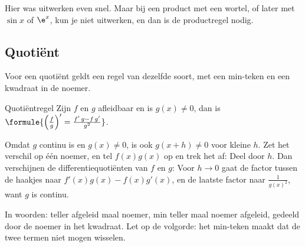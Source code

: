 Hier was uitwerken even snel. Maar bij een product met een wortel, of later met $\sin x$ of $\e^x$, kun je niet uitwerken, en dan is de productregel nodig.

\begin{oefeningen}
\end{oefeningen}

\subsection{Quotiënt}

Voor een quotiënt geldt een regel van dezelfde soort, met een min-teken en een kwadraat in de noemer.

\begin{theorie}
\begin{stelling}{Quotiëntregel}
Zijn $f$ en $g$ afleidbaar en is $g(x) \neq 0$, dan is \quad $\formule{\Bigl(\frac{f}{g}\Bigr)' = \frac{f'\,g - f\,g'}{g^2}}$.
\end{stelling}
\begin{bewijs}
Omdat $g$ continu is en $g(x) \neq 0$, is ook $g(x + h) \neq 0$ voor kleine $h$. Zet het verschil op één noemer, en tel $f(x)g(x)$ op en trek het af:
Deel door $h$. Dan verschijnen de differentiequotiënten van $f$ en $g$:
Voor $h \to 0$ gaat de factor tussen de haakjes naar $f'(x)g(x) - f(x)g'(x)$, en de laatste factor naar $\frac{1}{g(x)^2}$, want $g$ is continu.
\end{bewijs}
\end{theorie}

In woorden: teller afgeleid maal noemer, min teller maal noemer afgeleid, gedeeld door de noemer in het kwadraat. Let op de volgorde: het min-teken maakt dat de twee termen niet mogen wisselen.


